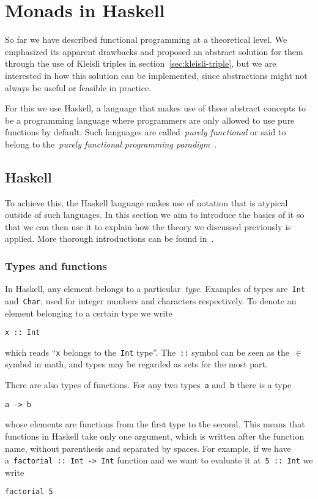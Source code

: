 \documentclass[../TFG.tex]{subfiles}
\begin{document}
\section{Monads in Haskell}
So far we have described functional programming at a theoretical level. We
emphasized its apparent drawbacks and proposed an abstract solution for them
through the use of Kleisli triples in section~\ref{sec:kleisli-triple}, but we
are interested in how this solution can be implemented, since abstractions might
not always be useful or feasible in practice.

For this we use Haskell, a language that makes use of these abstract concepts to
be a programming language where programmers are only allowed to use pure
functions by default. Such languages are called~\emph{purely functional} or said
to belong to the~\emph{purely functional programming
paradigm}~\cite{paradigms-overview}.

\subsection{Haskell}
To achieve this, the Haskell language makes use of notation that is atypical
outside of such languages. In this section we aim to introduce the basics of it
so that we can then use it to explain how the theory we discussed previously is
applied. More thorough introductions can be found in~\cite{haskell-org-docs}.

\subsubsection{Types and functions}
In Haskell, any element belongs to a particular~\emph{type}. Examples of types
are~\texttt{Int} and~\texttt{Char}, used for integer
numbers and characters respectively. To denote an element belonging to a certain
type we write
\begin{verbatim}
x :: Int
\end{verbatim}
which reads ``\texttt{x} belongs to the~\texttt{Int}
type''.
The~\texttt{::} symbol can be seen as the~\(\in\) symbol in math,
and types may be regarded as sets for the most part.

There are also types of functions. For any two types~\texttt{a}
and~\texttt{b} there is a type
\begin{verbatim}
a -> b
\end{verbatim}
whose elements are functions from the first type to the second. This means that
functions in Haskell take only one argument, which is written after the function
name, without parenthesis and separated by spaces. For example, if we have
a~\texttt{factorial :: Int -> Int} function and we want to evaluate
it at~\texttt{5 :: Int} we write
\begin{verbatim}
factorial 5
\end{verbatim}
\end{document}
